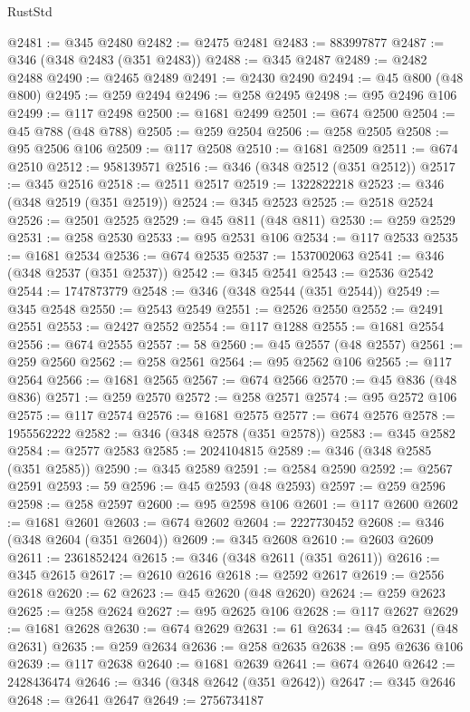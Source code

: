 \begin{lexlean}{RustStd}
\begin{coremodule}
{\begin{coremodule}
{{{{{{{{{{{{{{{{{{{{{{{{{{{{{{{{{{{{{{{@2481 := @345 @2480
@2482 := @2475 @2481
@2483 := 883997877
@2487 := @346 (@348 @2483 (@351 @2483))
@2488 := @345 @2487
@2489 := @2482 @2488
@2490 := @2465 @2489
@2491 := @2430 @2490
@2494 := @45 @800 (@48 @800)
@2495 := @259 @2494
@2496 := @258 @2495
@2498 := @95 @2496 @106
@2499 := @117 @2498
@2500 := @1681 @2499
@2501 := @674 @2500
@2504 := @45 @788 (@48 @788)
@2505 := @259 @2504
@2506 := @258 @2505
@2508 := @95 @2506 @106
@2509 := @117 @2508
@2510 := @1681 @2509
@2511 := @674 @2510
@2512 := 958139571
@2516 := @346 (@348 @2512 (@351 @2512))
@2517 := @345 @2516
@2518 := @2511 @2517
@2519 := 1322822218
@2523 := @346 (@348 @2519 (@351 @2519))
@2524 := @345 @2523
@2525 := @2518 @2524
@2526 := @2501 @2525
@2529 := @45 @811 (@48 @811)
@2530 := @259 @2529
@2531 := @258 @2530
@2533 := @95 @2531 @106
@2534 := @117 @2533
@2535 := @1681 @2534
@2536 := @674 @2535
@2537 := 1537002063
@2541 := @346 (@348 @2537 (@351 @2537))
@2542 := @345 @2541
@2543 := @2536 @2542
@2544 := 1747873779
@2548 := @346 (@348 @2544 (@351 @2544))
@2549 := @345 @2548
@2550 := @2543 @2549
@2551 := @2526 @2550
@2552 := @2491 @2551
@2553 := @2427 @2552
@2554 := @117 @1288
@2555 := @1681 @2554
@2556 := @674 @2555
@2557 := 58
@2560 := @45 @2557 (@48 @2557)
@2561 := @259 @2560
@2562 := @258 @2561
@2564 := @95 @2562 @106
@2565 := @117 @2564
@2566 := @1681 @2565
@2567 := @674 @2566
@2570 := @45 @836 (@48 @836)
@2571 := @259 @2570
@2572 := @258 @2571
@2574 := @95 @2572 @106
@2575 := @117 @2574
@2576 := @1681 @2575
@2577 := @674 @2576
@2578 := 1955562222
@2582 := @346 (@348 @2578 (@351 @2578))
@2583 := @345 @2582
@2584 := @2577 @2583
@2585 := 2024104815
@2589 := @346 (@348 @2585 (@351 @2585))
@2590 := @345 @2589
@2591 := @2584 @2590
@2592 := @2567 @2591
@2593 := 59
@2596 := @45 @2593 (@48 @2593)
@2597 := @259 @2596
@2598 := @258 @2597
@2600 := @95 @2598 @106
@2601 := @117 @2600
@2602 := @1681 @2601
@2603 := @674 @2602
@2604 := 2227730452
@2608 := @346 (@348 @2604 (@351 @2604))
@2609 := @345 @2608
@2610 := @2603 @2609
@2611 := 2361852424
@2615 := @346 (@348 @2611 (@351 @2611))
@2616 := @345 @2615
@2617 := @2610 @2616
@2618 := @2592 @2617
@2619 := @2556 @2618
@2620 := 62
@2623 := @45 @2620 (@48 @2620)
@2624 := @259 @2623
@2625 := @258 @2624
@2627 := @95 @2625 @106
@2628 := @117 @2627
@2629 := @1681 @2628
@2630 := @674 @2629
@2631 := 61
@2634 := @45 @2631 (@48 @2631)
@2635 := @259 @2634
@2636 := @258 @2635
@2638 := @95 @2636 @106
@2639 := @117 @2638
@2640 := @1681 @2639
@2641 := @674 @2640
@2642 := 2428436474
@2646 := @346 (@348 @2642 (@351 @2642))
@2647 := @345 @2646
@2648 := @2641 @2647
@2649 := 2756734187
}}}}}}}}}}}}}}}}}}}}}}}}}}}}}}}}}}}}}}}
\end{coremodule}}
\end{coremodule}
\end{lexlean}
